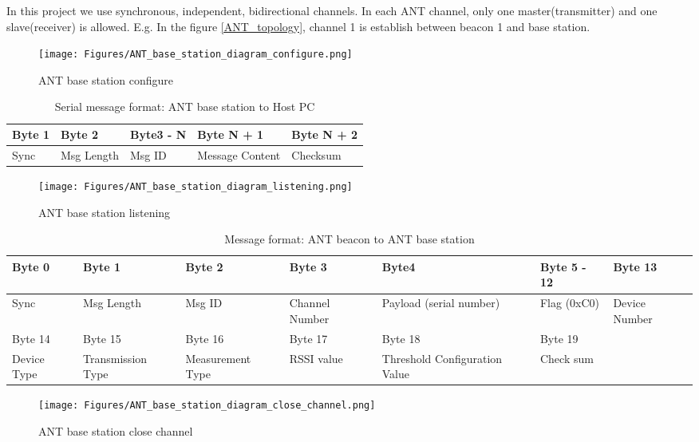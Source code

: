\documentclass{article}
\begin{document}
In this project we use synchronous, independent, bidirectional channels. In each ANT channel, only one master(transmitter) and one slave(receiver) is allowed. E.g. In the figure \ref{ANT_topology}, channel 1 is establish between beacon 1 and base station.

\begin{figure}[!h]
\begin{center}
\texttt{[image: Figures/ANT\_base\_station\_diagram\_configure.png]}
\caption{ANT base station configure}
\label{ANT_base_station_configure}
\end{center}
\end{figure}

\begin{table}[!h]
\caption{Serial message format: ANT base station to Host PC}
\label{serial_message_format}
\begin{center}
\begin{tabular}{|l|l|l|l|l|}
\hline
Byte 1 & Byte 2 & Byte3 - N & Byte N + 1 & Byte N + 2 \\
\hline
Sync & Msg Length &  Msg ID & Message Content & Checksum \\
\hline
\end{tabular}
\end{center}
\end{table}

\begin{figure}[!h]
\begin{center}
\texttt{[image: Figures/ANT\_base\_station\_diagram\_listening.png]}
\caption{ANT base station listening}
\label{ANT_base_station_listening}
\end{center}
\end{figure}


\begin{table}[!h]
\caption{Message format: ANT beacon to ANT base station}
\label{ANT_message_format}
\begin{center}
\small
\begin{tabular}{|p{2cm}|p{2cm}|p{2cm}|p{2cm}|p{2cm}|p{2cm}|p{2cm}|}
\hline
Byte 0 & Byte 1 & Byte 2 & Byte 3 & Byte4 & Byte 5 - 12 & Byte 13 \\
\hline
Sync  & Msg Length & Msg ID & Channel Number & Payload (serial number) &  Flag (0xC0) & Device Number \\
\hline
Byte 14 & Byte 15 & Byte 16 & Byte 17 & Byte 18 & Byte 19 & \\
\hline
Device Type & Transmission Type & Measurement Type & RSSI value & Threshold Configuration Value & Check sum & \\
\hline
\end{tabular}
\end{center}
\end{table}
\begin{figure}[!h]
\begin{center}
\texttt{[image: Figures/ANT\_base\_station\_diagram\_close\_channel.png]}
\caption{ANT base station close channel}
\label{ANT_base_station_close_channel}
\end{center}
\end{figure}
\end{document}
